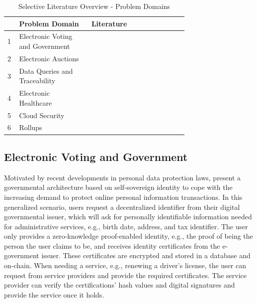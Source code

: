 \setlength{\tabcolsep}{2ex}
\renewcommand{\arraystretch}{1.5}%
\begin{table}[ht]
	\centering
	    \caption{Selective Literature Overview - Problem Domains}
		\begin{tabular}{| m{0.02\linewidth} | m{0.3\linewidth} | m{0.4\linewidth}|}
		\hline
		\textbf{} & \textbf{Problem Domain} & \textbf{Literature} \\ \hline
            1 & Electronic Voting and \newline Government & \citet{Bansod, Guo, Querejeta} \\  \hline
            2 & Electronic Auctions & \citet{LiXue, WangZhaoMu} \\ \hline 
            3 & Data Queries and \newline Traceability & \citet{Godden, XueWang}  \\  \hline
            4 & Electronic Healthcare & \citet{LuongPark, ZHENG, WangEtAl, Huangetal} \\  \hline 
            5 & Cloud Security & \citet{LiuWangPengXing, Major, Munivel, Kanagamani} \\  \hline 
            6 & Rollups & \citet{chen2022review, scalingintro, zksyncintro, buterinrollups} \\  \hline 
	\end{tabular}
\label{tab:domains}
\end{table}

\subsection{Electronic Voting and Government}
Motivated by recent developments in personal data protection laws, \citet{Bansod} present a governmental architecture based on self-sovereign identity to cope with the increasing demand to protect online personal information transactions. In this generalized scenario, users request a decentralized identifier from their digital governmental issuer, which will ask for personally identifiable information needed for administrative services, e.g., birth date, address, and tax identifier. The user only provides a zero-knowledge proof-enabled identity, e.g., the proof of being the person the user claims to be, and receives identity certificates from the e-government issuer. These certificates are encrypted and stored in a database and on-chain. When needing a service, e.g., renewing a driver's license, the user can request from service providers and provide the required certificates. The service provider can verify the certifications' hash values and digital signatures and provide the service once it holds.

